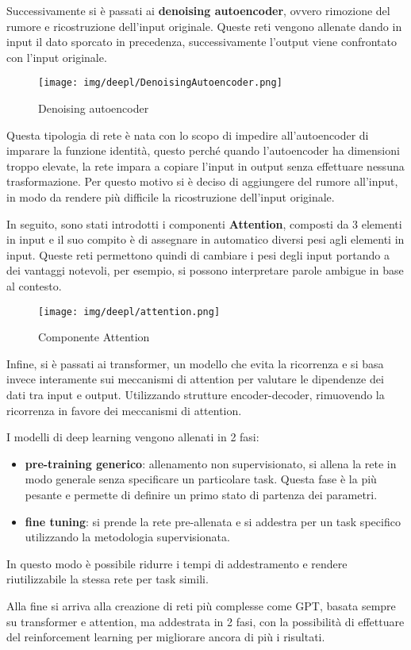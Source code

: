 Successivamente si è passati ai \textbf{denoising autoencoder}, ovvero rimozione
del rumore e ricostruzione dell'input originale. Queste reti vengono allenate
dando in input il dato sporcato in precedenza, successivamente l'output viene
confrontato con l'input originale.
\begin{figure}
      \centering
      \texttt{[image: img/deepl/DenoisingAutoencoder.png]}
      \caption{Denoising autoencoder}
      \label{fig:denoising}
\end{figure}
Questa tipologia di rete è nata con lo scopo di impedire all'autoencoder di
imparare la funzione identità, questo perché quando l'autoencoder ha dimensioni
troppo elevate, la rete impara a copiare l'input in output senza effettuare
nessuna trasformazione. Per questo motivo si è deciso di aggiungere del rumore
all'input, in modo da rendere più difficile la ricostruzione dell'input
originale.

In seguito, sono stati introdotti i componenti \textbf{Attention}, composti da 3
elementi in input e il suo compito è di assegnare in automatico diversi pesi
agli elementi in input. Queste reti permettono quindi di cambiare i pesi degli
input portando a dei vantaggi notevoli, per esempio, si possono interpretare
parole ambigue in base al contesto.
\begin{figure}
      \centering
      \texttt{[image: img/deepl/attention.png]}
      \caption{Componente Attention}
      \label{fig:attention}
\end{figure}
Infine, si è passati ai transformer, un modello che evita la ricorrenza e si 
basa invece interamente sui meccanismi di attention per valutare le dipendenze 
dei dati tra input e output. Utilizzando strutture encoder-decoder, rimuovendo 
la ricorrenza in favore dei meccanismi di attention.

I modelli di deep learning vengono allenati in 2 fasi:
\begin{itemize}
      \item \textbf{pre-training generico}: allenamento non supervisionato, si
            allena la rete in modo generale senza specificare un particolare
            task. Questa fase è la più pesante e permette di definire un primo
            stato di partenza dei parametri.
      \item \textbf{fine tuning}: si prende la rete pre-allenata e si addestra
            per un task specifico utilizzando la metodologia supervisionata.
\end{itemize}
In questo modo è possibile ridurre i tempi di addestramento e rendere
riutilizzabile la stessa rete per task simili.

Alla fine si arriva alla creazione di reti più complesse come GPT, basata sempre
su transformer e attention, ma addestrata in 2 fasi, con la possibilità di
effettuare del reinforcement learning per migliorare ancora di più i risultati.